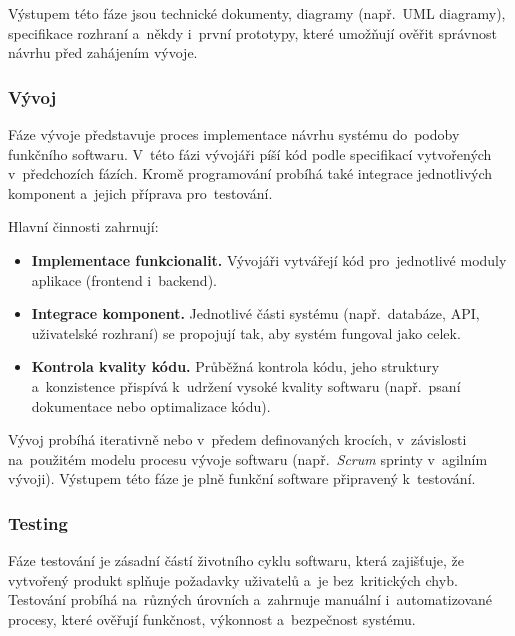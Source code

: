 \documentclass[male,czech,api_bc]{kitheses}
\begin{document}
Výstupem této fáze jsou technické dokumenty, diagramy (např.~UML diagramy), specifikace rozhraní a~někdy i~první prototypy, které umožňují ověřit správnost návrhu před zahájením vývoje.\cite{softwaroveInzenyrstviSem3}

\subsubsection{Vývoj}

Fáze vývoje představuje proces implementace návrhu systému do~podoby funkčního softwaru. V~této fázi vývojáři píší kód podle specifikací vytvořených v~předchozích fázích. Kromě programování probíhá také integrace jednotlivých komponent a~jejich příprava pro~testování.

Hlavní činnosti zahrnují:
\begin{itemize}
	\item \textbf{Implementace funkcionalit.} Vývojáři vytvářejí kód pro~jednotlivé moduly aplikace (frontend i~backend).
	\item \textbf{Integrace komponent.} Jednotlivé části systému (např.~databáze, API, uživatelské rozhraní) se propojují tak, aby systém fungoval jako celek.
	\item \textbf{Kontrola kvality kódu.} Průběžná kontrola kódu, jeho struktury a~konzistence přispívá k~udržení vysoké kvality softwaru (např.~psaní dokumentace nebo optimalizace kódu).
\end{itemize}

Vývoj probíhá iterativně nebo v~předem definovaných krocích, v~závislosti na~použitém modelu procesu vývoje softwaru (např.~\textit{Scrum} sprinty v~agilním vývoji). Výstupem této fáze je plně funkční software připravený k~testování.

\subsubsection{Testing}

Fáze testování je zásadní částí životního cyklu softwaru, která zajišťuje, že vytvořený produkt splňuje požadavky uživatelů a~je bez~kritických chyb. Testování probíhá na~různých úrovních a~zahrnuje manuální i~automatizované procesy, které ověřují funkčnost, výkonnost a~bezpečnost systému.
\end{document}
